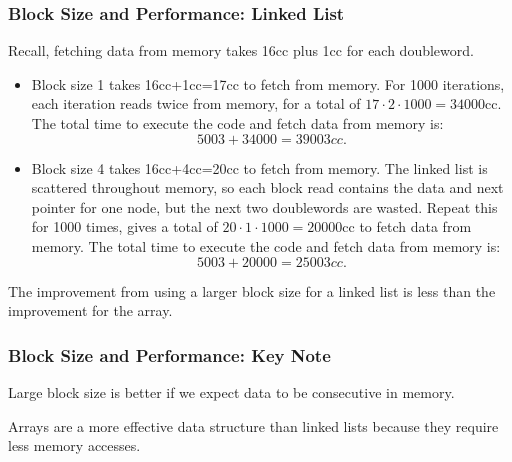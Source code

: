 {%
\begin{frame}[fragile]\frametitle{Block Size and Performance: Linked List}
Recall, fetching data from memory takes 16cc plus 1cc for each doubleword.
\begin{itemize}
\item Block size 1 takes 16cc+1cc=17cc to fetch from memory. For 1000 iterations, each iteration reads twice from memory, for a total of $17\cdot 2 \cdot 1000 = 34000$cc. The total time to execute the code and fetch data from memory is:
$$5003 + 34000 =  39003cc.$$
\item Block size 4 takes 16cc+4cc=20cc to fetch from memory. The linked list is scattered throughout memory, so each block read contains the data and next pointer for one node, but the next two doublewords are wasted. Repeat this for 1000 times, gives a total of $20\cdot 1 \cdot 1000=20000$cc to fetch data from memory. The total time to execute the code and fetch data from memory is:
$$5003 + 20000 = 25003cc.$$
\end{itemize}
The improvement from using a larger block size for a linked list is less than the improvement for the array.
\end{frame}
}\fi
\begin{frame}[fragile]\frametitle{Block Size and Performance: Key Note}

Large block size is better if we expect data to be consecutive in memory.
\hfill\break

Arrays are a more effective data structure than linked lists because they require less memory accesses.

\end{frame}




  
